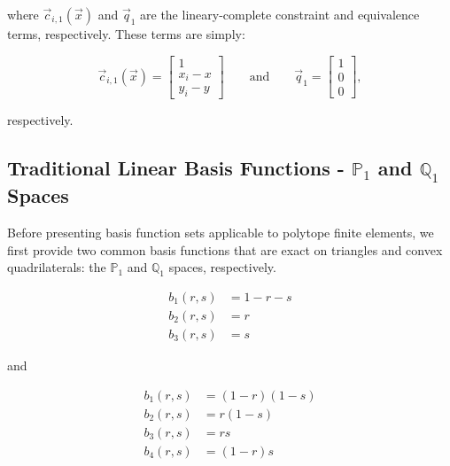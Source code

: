 \noindent where $\vec{c}_{i,1}(\vec{x})$ and $\vec{q}_1$ are the lineary-complete constraint and equivalence terms, respectively. These terms are simply:

\begin{equation}
\vec{c}_{i,1}(\vec{x}) = \left[
\begin{array}{c}
1 \\
x_i - x \\
y_i - y
\end{array} \right]
  \qquad \text{and} \qquad \vec{q}_1 = \left[
\begin{array}{c}
1 \\
0 \\
0
\end{array} \right],
\label{eq::BF_linear_constraint_terms}
\end{equation}

\noindent respectively.

\subsection{Traditional Linear Basis Functions - $\mathbb{P}_{1}$ and $\mathbb{Q}_{1}$ Spaces}
\label{sec::BF_2DLinear_LDandBLD}

Before presenting basis function sets applicable to polytope finite elements, we first provide two common basis functions that are exact on triangles and convex quadrilaterals: the $\mathbb{P}_{1}$ and $\mathbb{Q}_{1}$ spaces, respectively. 

\begin{equation}
\label{eq::2D_lin_basis_functions}
\begin{aligned}
	b_1(r,s) & = 1-r-s \\
	b_2(r,s) & = r \\
	b_3(r,s) & = s 
\end{aligned}
\end{equation}

\noindent 

and

\begin{equation}
\label{eq::BiL_basis_functions}
\begin{aligned}
	b_1(r,s) & = (1-r)(1-s) \\
	b_2(r,s) & = r(1-s) \\
	b_3(r,s) & = rs \\
	b_4(r,s) & = (1-r)s
\end{aligned}
\end{equation}


